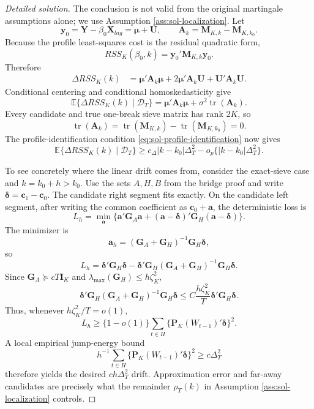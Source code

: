 \documentclass[12pt]{article}
\numberwithin{equation}{section}
\theoremstyle{definition}
\newcommand{\E}{\mathbb E}
\begin{document}
\begin{proof}[Detailed solution]
The conclusion is not valid from the original martingale assumptions alone;
we use Assumption \ref{ass:sol-localization}.  Let
\[
    \bm y_0=\bm Y-\beta_0\bm X_{lag}=\bm\mu+\bm U,
    \qquad
    \bm A_k=\bm M_{K,k}-\bm M_{K,k_0}.
\]
Because the profile least-squares cost is the residual quadratic form,
\[
    RSS_K(\beta_0,k)=\bm y_0'\bm M_{K,k}\bm y_0.
\]
Therefore
\begin{align*}
    \Delta RSS_K(k)
    &=\bm\mu'\bm A_k\bm\mu
      +2\bm\mu'\bm A_k\bm U
      +\bm U'\bm A_k\bm U.
\end{align*}
Conditional centering and conditional homoskedasticity give
\[
    \E\{\Delta RSS_K(k)\mid\mathcal D_T\}
    =\bm\mu'\bm A_k\bm\mu
      +\sigma^2\operatorname{tr}(\bm A_k).
\]
Every candidate and true one-break sieve matrix has rank \(2K\), so
\[
    \operatorname{tr}(\bm A_k)
    =\operatorname{tr}(\bm M_{K,k})-
      \operatorname{tr}(\bm M_{K,k_0})=0.
\]
The profile-identification condition
\eqref{eq:sol-profile-identification} now gives
\[
    \E\{\Delta RSS_K(k)\mid\mathcal D_T\}
    \geq c_\Delta|k-k_0|\Delta_T^2
       -o_p\{|k-k_0|\Delta_T^2\}.
\]

To see concretely where the linear drift comes from, consider the exact-sieve
case and \(k=k_0+h>k_0\).  Use the sets \(A,H,B\) from the bridge proof and
write \(\bm\delta=\bm c_1-\bm c_0\).  The candidate right segment fits
exactly.  On the candidate left segment, after writing the common coefficient
as \(\bm c_0+\bm a\), the deterministic loss is
\[
    L_h=\min_{\bm a}
       \{\bm a'\bm G_A\bm a+
         (\bm a-\bm\delta)'\bm G_H(\bm a-\bm\delta)\}.
\]
The minimizer is
\[
    \bm a_h=(\bm G_A+\bm G_H)^{-1}\bm G_H\bm\delta,
\]
so
\[
    L_h
    =\bm\delta'\bm G_H\bm\delta
      -\bm\delta'\bm G_H
       (\bm G_A+\bm G_H)^{-1}
       \bm G_H\bm\delta.
\]
Since \(\bm G_A\succeq cT\bm I_K\) and
\(\lambda_{\max}(\bm G_H)\leq h\zeta_K^2\),
\[
    \bm\delta'\bm G_H
       (\bm G_A+\bm G_H)^{-1}
       \bm G_H\bm\delta
    \leq C\frac{h\zeta_K^2}{T}
          \bm\delta'\bm G_H\bm\delta.
\]
Thus, whenever \(h\zeta_K^2/T=o(1)\),
\[
    L_h\geq\{1-o(1)\}
       \sum_{t\in H}
       \{\bm P_K(W_{t-1})'\bm\delta\}^2.
\]
A local empirical jump-energy bound
\[
    h^{-1}\sum_{t\in H}
       \{\bm P_K(W_{t-1})'\bm\delta\}^2
       \geq c\Delta_T^2
\]
therefore yields the desired \(ch\Delta_T^2\) drift.  Approximation error and
far-away candidates are precisely what the remainder
\(\rho_T(k)\) in Assumption \ref{ass:sol-localization} controls.
\end{proof}
\end{document}
